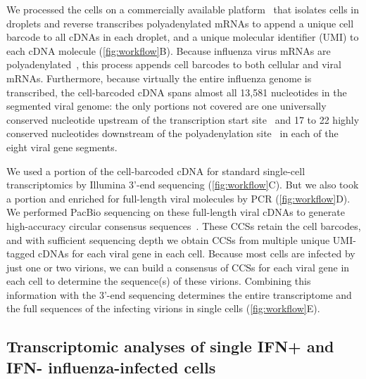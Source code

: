 \documentclass[10pt,letterpaper]{article}
\newcommand{\FIG}[1]{\autoref{fig:#1}}
\begin{document}
We processed the cells on a commercially available platform~\citep{zheng2017massively} that isolates cells in droplets and reverse transcribes polyadenylated mRNAs to append a unique cell barcode to all cDNAs in each droplet, and a unique molecular identifier (UMI) to each cDNA molecule (\FIG{workflow}B).
Because influenza virus mRNAs are polyadenylated~\citep{robertson1981polyadenylation}, this process appends cell barcodes to both cellular and viral mRNAs.
Furthermore, because virtually the entire influenza genome is transcribed, the cell-barcoded cDNA spans almost all 13,581 nucleotides in the segmented viral genome: the only portions not covered are one universally conserved nucleotide upstream of the transcription start site~\citep{koppstein2015sequencing} and 17 to 22 highly conserved nucleotides downstream of the polyadenylation site~\citep{robertson1981polyadenylation} in each of the eight viral gene segments.

We used a portion of the cell-barcoded cDNA for standard single-cell transcriptomics by Illumina 3'-end sequencing (\FIG{workflow}C).
But we also took a portion and enriched for full-length viral molecules by PCR (\FIG{workflow}D).
We performed PacBio sequencing on these full-length viral cDNAs to generate high-accuracy circular consensus sequences~\citep[CCSs;][]{travers2010flexible}.
These CCSs retain the cell barcodes, and with sufficient sequencing depth we obtain CCSs from multiple unique UMI-tagged cDNAs for each viral gene in each cell.
Because most cells are infected by just one or two virions, we can build a consensus of CCSs for each viral gene in each cell to determine the sequence(s) of these virions.
Combining this information with the 3'-end sequencing determines the entire transcriptome and the full sequences of the infecting virions in single cells (\FIG{workflow}E).

\subsection*{Transcriptomic analyses of single IFN+ and IFN- influenza-infected cells}
\end{document}
